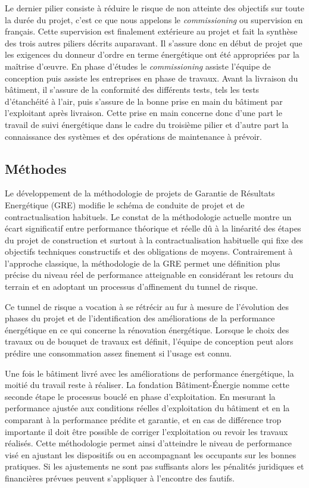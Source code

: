 Le dernier pilier consiste à réduire le risque de non atteinte des objectifs sur toute la durée du projet, c'est ce que nous appelons le \textit{commissioning} ou supervision en français. Cette supervision est finalement extérieure au projet et fait la synthèse des trois autres piliers décrits auparavant. Il s'assure donc en début de projet que les exigences du donneur d'ordre en terme énergétique ont été appropriées par la maîtrise d'œuvre. En phase d'études le \textit{commissioning} assiste l'équipe de conception puis assiste les entreprises en phase de travaux. Avant la livraison du bâtiment, il s'assure de la conformité des différents tests, tels les tests d'étanchéité à l'air, puis s'assure de la bonne prise en main du bâtiment par l'exploitant après livraison. Cette prise en main concerne donc d'une part le travail de suivi énergétique dans le cadre du troisième pilier et d'autre part la connaissance des systèmes et des opérations de maintenance à prévoir. 

\subsection{Méthodes}

Le développement de la méthodologie de projets de Garantie de Résultats Energétique (GRE) modifie le schéma de conduite de projet et de contractualisation habituels. Le constat de la méthodologie actuelle montre un écart significatif entre performance théorique et réelle dû à la linéarité des étapes du projet de construction et surtout à la contractualisation habituelle qui fixe des objectifs techniques constructifs et des obligations de moyens. Contrairement à l'approche classique, la méthodologie de la GRE permet une définition plus précise du niveau réel de performance atteignable en considérant les retours du terrain et en adoptant un processus d'affinement du tunnel de risque.

Ce tunnel de risque a vocation à se rétrécir au fur à mesure de l'évolution des phases du projet et de l'identification des améliorations de la performance énergétique en ce qui concerne la rénovation énergétique. Lorsque le choix des travaux ou de bouquet de travaux est définit, l'équipe de conception peut alors prédire une consommation assez finement si l'usage est connu.

Une fois le bâtiment livré avec les améliorations de performance énergétique, la moitié du travail reste à réaliser. La fondation Bâtiment-Énergie \cite{FBE-16} nomme cette seconde étape le processus bouclé en phase d'exploitation. En mesurant la performance ajustée aux conditions réelles d'exploitation du bâtiment et en la comparant à la performance prédite et garantie, et en cas de différence trop importante il doit être possible de corriger l'exploitation ou revoir les travaux réalisés. Cette méthodologie permet ainsi d'atteindre le niveau de performance visé en ajustant les dispositifs ou en accompagnant les occupants sur les bonnes pratiques. Si les ajustements ne sont pas suffisants alors les pénalités juridiques et financières prévues peuvent s'appliquer à l'encontre des fautifs.

